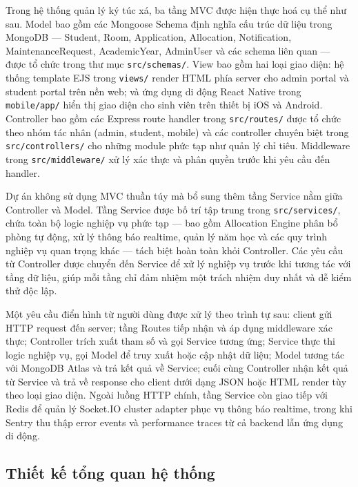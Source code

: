 ﻿\documentclass[a4paper,12pt,openany,oneside]{report}
\begin{document}
Trong hệ thống quản lý ký túc xá, ba tầng MVC được hiện thực hoá cụ thể như
sau. Model bao gồm các Mongoose Schema định nghĩa cấu trúc dữ liệu trong
MongoDB --- Student, Room, Application, Allocation, Notification,
MaintenanceRequest, AcademicYear, AdminUser và các schema liên quan --- được tổ
chức trong thư mục \texttt{src/schemas/}. View bao gồm hai loại giao diện: hệ
thống template EJS trong \texttt{views/} render HTML phía server cho admin
portal và student portal trên nền web; và ứng dụng di động React Native trong
\texttt{mobile/app/} hiển thị giao diện cho sinh viên trên thiết bị iOS và
Android. Controller bao gồm các Express route handler trong \texttt{src/routes/}
được tổ chức theo nhóm tác nhân (admin, student, mobile) và các controller
chuyên biệt trong \texttt{src/controllers/} cho những module phức tạp như quản
lý chỉ tiêu. Middleware trong \texttt{src/middleware/} xử lý xác thực và phân
quyền trước khi yêu cầu đến handler.

Dự án không sử dụng MVC thuần túy mà bổ sung thêm tầng Service nằm giữa
Controller và Model. Tầng Service được bố trí tập trung trong \texttt{src/services/},
chứa toàn bộ logic nghiệp vụ phức tạp --- bao gồm Allocation Engine phân bổ
phòng tự động, xử lý thông báo realtime, quản lý năm học và các quy trình
nghiệp vụ quan trọng khác --- tách biệt hoàn toàn khỏi Controller. Các yêu cầu
từ Controller được chuyển đến Service để xử lý nghiệp vụ trước khi tương tác
với tầng dữ liệu, giúp mỗi tầng chỉ đảm nhiệm một trách nhiệm duy nhất và dễ
kiểm thử độc lập.

Một yêu cầu điển hình từ người dùng được xử lý theo trình tự sau: client gửi
HTTP request đến server; tầng Routes tiếp nhận và áp dụng middleware xác thực;
Controller trích xuất tham số và gọi Service tương ứng; Service thực thi logic
nghiệp vụ, gọi Model để truy xuất hoặc cập nhật dữ liệu; Model tương tác với
MongoDB Atlas và trả kết quả về Service; cuối cùng Controller nhận kết quả từ
Service và trả về response cho client dưới dạng JSON hoặc HTML render tùy theo
loại giao diện. Ngoài luồng HTTP chính, tầng Service còn giao tiếp với Redis để
quản lý Socket.IO cluster adapter phục vụ thông báo realtime, trong khi Sentry
thu thập error events và performance traces từ cả backend lẫn ứng dụng di
động.

\subsection{Thiết kế tổng quan hệ thống}
\label{subsec:package_overview}
\end{document}
